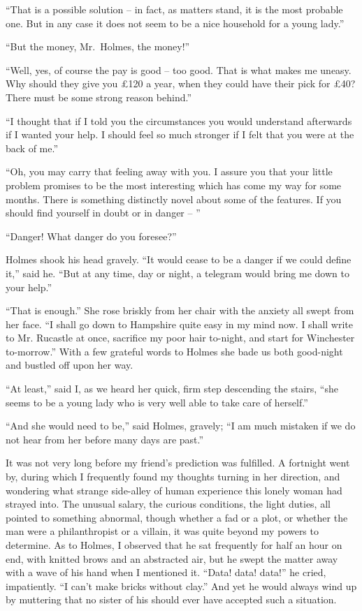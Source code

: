 “That is a possible solution -- in fact, as matters stand, it is
the most probable one. But in any case it does not seem to
be a nice household for a young lady.”

“But the money, Mr.~Holmes, the money!”

“Well, yes, of course the pay is good -- too good. That is
what makes me uneasy. Why should they give you £120 a
year, when they could have their pick for £40? There must
be some strong reason behind.”

“I thought that if I told you the circumstances you would
understand afterwards if I wanted your help. I should feel so
much stronger if I felt that you were at the back of me.”

“Oh, you may carry that feeling away with you. I assure
you that your little problem promises to be the most interesting
which has come my way for some months. There is
something distinctly novel about some of the features. If
you should find yourself in doubt or in danger -- ”

“Danger! What danger do you foresee?”

Holmes shook his head gravely. “It would cease to be a
danger if we could define it,” said he. “But at any time, day
or night, a telegram would bring me down to your help.”

“That is enough.” She rose briskly from her chair with
the anxiety all swept from her face. “I shall go down to
Hampshire quite easy in my mind now. I shall write to Mr.
Rucastle at once, sacrifice my poor hair to-night, and start
for Winchester to-morrow.” With a few grateful words to
Holmes she bade us both good-night and bustled off upon
her way.

“At least,” said I, as we heard her quick, firm step descending
the stairs, “she seems to be a young lady who is very well
able to take care of herself.”

“And she would need to be,” said Holmes, gravely; “I am
much mistaken if we do not hear from her before many days
are past.”

It was not very long before my friend’s prediction was fulfilled.
A fortnight went by, during which I frequently found
my thoughts turning in her direction, and wondering what
strange side-alley of human experience this lonely woman had
strayed into. The unusual salary, the curious conditions, the
light duties, all pointed to something abnormal, though whether
a fad or a plot, or whether the man were a philanthropist or a
villain, it was quite beyond my powers to determine. As to
Holmes, I observed that he sat frequently for half an hour on
end, with knitted brows and an abstracted air, but he swept
the matter away with a wave of his hand when I mentioned it.
“Data! data! data!” he cried, impatiently. “I can’t make
bricks without clay.” And yet he would always wind up by
muttering that no sister of his should ever have accepted such
a situation.

